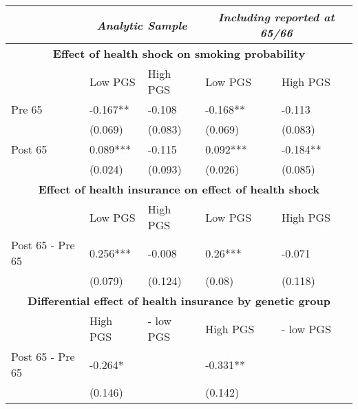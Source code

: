 % 
\begin{tabular}{l| p{3cm}p{3cm}| p{3cm}p{3cm}}
  & \multicolumn{2}{c}{ \textit{Analytic Sample}} & \multicolumn{2}{c}{ \textit{Including reported at 65/66}} \\
 \toprule
  \multicolumn{5}{c}{ \textbf{Effect of health shock on smoking probability}} \\
 \midrule
 & Low PGS & High PGS & Low PGS & High PGS \\ 
   \midrule
Pre 65 & -0.167** & -0.108 & -0.168** & -0.113 \\ 
   & (0.069) & (0.083) & (0.069) & (0.083) \\ 
  Post 65 & 0.089*** & -0.115 & 0.092*** & -0.184** \\ 
   & (0.024) & (0.093) & (0.026) & (0.085) \\ 
   \toprule \multicolumn{5}{c}{ \textbf{Effect of health insurance on effect of health shock}} \\
 \midrule
 & Low PGS & High PGS & Low PGS & High PGS \\ 
   \midrule
Post 65 - Pre 65 & 0.256*** & -0.008 & 0.26*** & -0.071 \\ 
   & (0.079) & (0.124) & (0.08) & (0.118) \\ 
   \toprule \multicolumn{5}{c}{ \textbf{Differential effect of health insurance by genetic group}} \\
 \midrule
 & High PGS  & - low PGS & High PGS  & - low PGS \\ 
   \midrule
Post 65 - Pre 65 & -0.264* &  & -0.331** &  \\ 
   & (0.146) &  & (0.142) &  \\ 
  \end{tabular}
